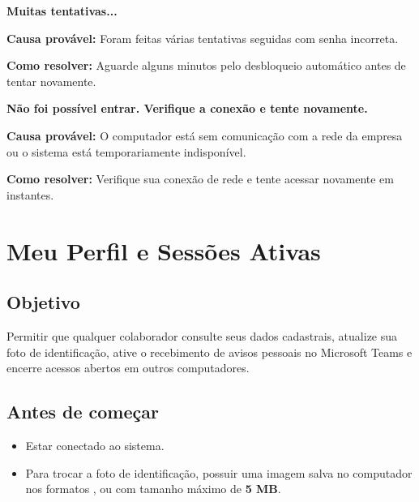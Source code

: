 \begin{remark}
\textbf{Muitas tentativas...}\par
\textbf{Causa provável:} Foram feitas várias tentativas seguidas com senha incorreta.\par
\textbf{Como resolver:} Aguarde alguns minutos pelo desbloqueio automático antes de tentar novamente.
\end{remark}

\Needspace{100pt}
\begin{remark}
\textbf{Não foi possível entrar. Verifique a conexão e tente novamente.}\par
\textbf{Causa provável:} O computador está sem comunicação com a rede da empresa ou o sistema está temporariamente indisponível.\par
\textbf{Como resolver:} Verifique sua conexão de rede e tente acessar novamente em instantes.
\end{remark}

\section{Meu Perfil e Sessões Ativas}

\subsection*{Objetivo}

Permitir que qualquer colaborador consulte seus dados cadastrais, atualize sua foto de identificação, ative o recebimento de avisos pessoais no Microsoft Teams e encerre acessos abertos em outros computadores.\par

\subsection*{Antes de começar}

\begin{itemize}
\item Estar conectado ao sistema.
\item Para trocar a foto de identificação, possuir uma imagem salva no computador nos formatos ,  ou  com tamanho máximo de \textbf{5 MB}.
\end{itemize}

